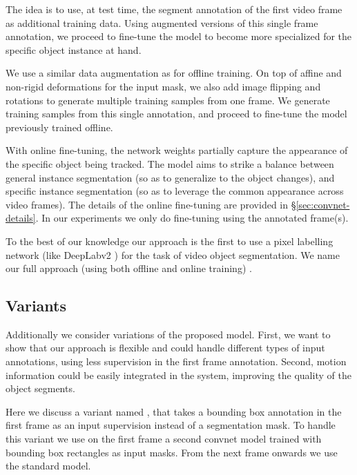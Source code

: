 \documentclass[10pt,twocolumn,letterpaper]{article}
\makeatletter
\renewcommand{\paragraph}{\@startsection{paragraph}{4}{\z@}{0.5ex \@plus 1ex \@minus .2ex}{-0.5em}{\normalfont \normalsize \bfseries}}
\makeatother
\begin{document}
The idea is to use, at test time, the segment annotation of the first video frame as additional training data.
Using augmented versions of this single frame annotation, we proceed to fine-tune the model to become more specialized for the specific object instance at hand.

We use a similar data augmentation as for offline training. On top of affine and non-rigid deformations for the input mask, we also add image flipping and rotations to generate multiple training samples from one frame.
We generate  training samples from this single annotation,
and proceed to fine-tune the model previously trained offline.

With online fine-tuning, the network weights partially capture the appearance of the specific object being tracked. The model aims to strike a balance between general instance segmentation
(so as to generalize to the object changes), and specific instance segmentation (so as to leverage the common appearance across video frames). The details of the online fine-tuning are provided in
\S\ref{sec:convnet-details}. In our experiments we only do fine-tuning using the annotated frame(s).

To the best of our knowledge our approach is the first to use a pixel labelling network (like DeepLabv2 \cite{Chen2016ArxivDeeplabv2}) for the task of video object segmentation.
We name our full approach (using both offline and online training) .



\subsection{Variants}
\label{sec:method-variants}
Additionally we consider variations of the proposed model.
First, we want to show that our approach is flexible and could handle different types of input annotations, using less supervision in the first frame annotation.
Second, motion information could be easily integrated in the system, improving the quality of the object segments.

\paragraph{Box annotation}
Here we discuss a variant named , that takes a bounding box annotation in the first frame as an input supervision instead of a segmentation mask.
To handle this variant we use on the first frame a second convnet model trained with bounding box rectangles as input masks. From the next frame onwards we use the standard  model.
\end{document}

